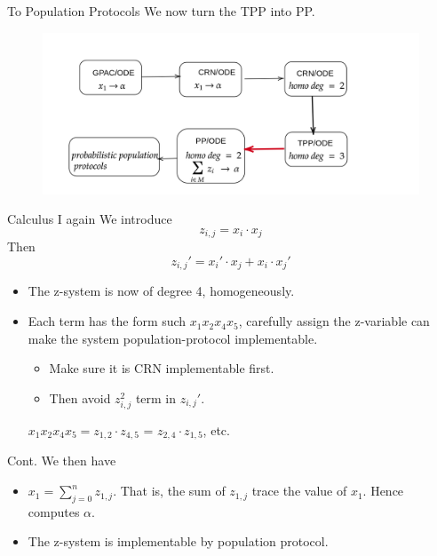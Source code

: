 \documentclass[aspectratio=169]{beamer}
\begin{document}
\begin{frame}[Clean]{To Population Protocols}
    We now turn the TPP into PP.
    \begin{figure}[tb]
        \centering
        \includegraphics[scale=0.25]{flow3}
    \end{figure}
\end{frame}

\begin{frame}[Clean]{Calculus I again}
    We introduce
    \[
        z_{i,j} = x_i \cdot x_j
    \]
    Then
    \[
        z_{i,j}' = x_i' \cdot x_j + x_i \cdot x_j'
    \]
    \begin{itemize}
        \item The z-system is now of degree 4, homogeneously.
        \item Each term has the form such $x_1 x_2 x_4 x_5$, carefully assign the z-variable can make the system population-protocol implementable.
        \begin{itemize}
            \item Make sure it is CRN implementable first.
            \item Then avoid $z_{i,j}^2$ term in $z_{i,j}'$.
        \end{itemize}
     $x_1 x_2 x_4 x_5 = z_{1,2} \cdot z_{4,5}$ = $ z_{2,4}\cdot z_{1,5}$, etc.
    \end{itemize}
\end{frame}
\begin{frame}{Cont.}
We then have
    \begin{itemize}
        \item $x_1 = \displaystyle\sum_{j=0}^{n} z_{1,j}$. That is, the sum of $z_{1,j}$ trace the value of $x_1$. Hence computes $\alpha$.
        \item The z-system is implementable by population protocol.
    \end{itemize}
\end{frame}
\end{document}
